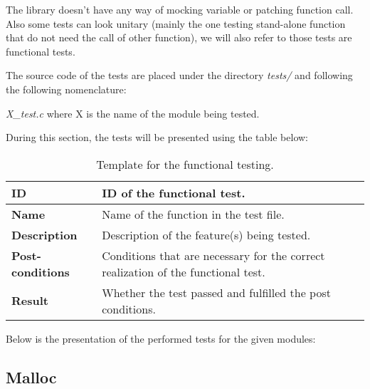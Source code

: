 The library doesn't have any way of mocking variable or patching function call. Also some tests can look unitary (mainly the one testing stand-alone function that do not need the call of other function), we will also refer to those tests are functional tests.

The source code of the tests are placed under the directory \textit{tests/} and following the following nomenclature:

\textit{X\_test.c} where X is the name of the module being tested.

During this section, the tests will be presented using the table below:

\begin{table}[H]
    \centering
    \begin{tabular}{| p{3cm} | p{7cm} |}
    \hline
    \textbf{ID}             & ID of the functional test.\\ \hline
    \textbf{Name}           & Name of the function in the test file.\\ \hline
    \textbf{Description}    & Description of the feature(s) being tested. \\ \hline
    \textbf{Post-conditions} & Conditions that are necessary for the correct realization of the functional test. \\ \hline
    \textbf{Result}			 & Whether the test passed and fulfilled the post conditions.	 \\ \hline
    \end{tabular}
    \caption{Template for the functional testing.}
\end{table}


Below is the presentation of the performed tests for the given modules:


\edef\functionalTestCounter{0}

\subsection{Malloc}


